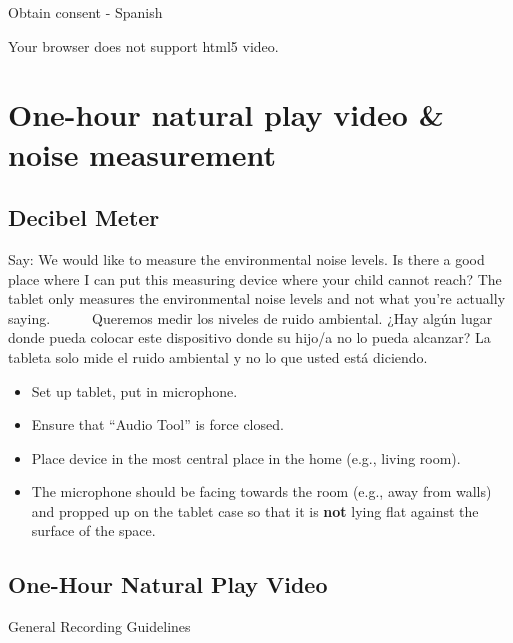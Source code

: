 \documentclass[
]{book}
\providecommand{\tightlist}{%
  \setlength{\itemsep}{0pt}\setlength{\parskip}{0pt}}
\begin{document}
Obtain consent - Spanish

Your browser does not support html5 video.

\hypertarget{one-hour-natural-play-video-noise-measurement}{%
\section{One-hour natural play video \& noise measurement}\label{one-hour-natural-play-video-noise-measurement}}

\hypertarget{decibel-meter}{%
\subsection{Decibel Meter}\label{decibel-meter}}

Say: We would like to measure the environmental noise levels. Is there a good place where I can put this measuring device where your child cannot reach? The tablet only measures the environmental noise levels and not what you're actually saying.
    Queremos medir los niveles de ruido ambiental. ¿Hay algún lugar donde pueda colocar este dispositivo donde su hijo/a no lo pueda alcanzar? La tableta solo mide el ruido ambiental y no lo que usted está diciendo.

\begin{itemize}
\tightlist
\item
  Set up tablet, put in microphone.
\item
  Ensure that ``Audio Tool'' is force closed.
\item
  Place device in the most central place in the home (e.g., living room).
\item
  The microphone should be facing towards the room (e.g., away from walls) and propped up on the tablet case so that it is \textbf{not} lying flat against the surface of the space.
\end{itemize}

\hypertarget{one-hour-natural-play-video}{%
\subsection{One-Hour Natural Play Video}\label{one-hour-natural-play-video}}

General Recording Guidelines
\end{document}
